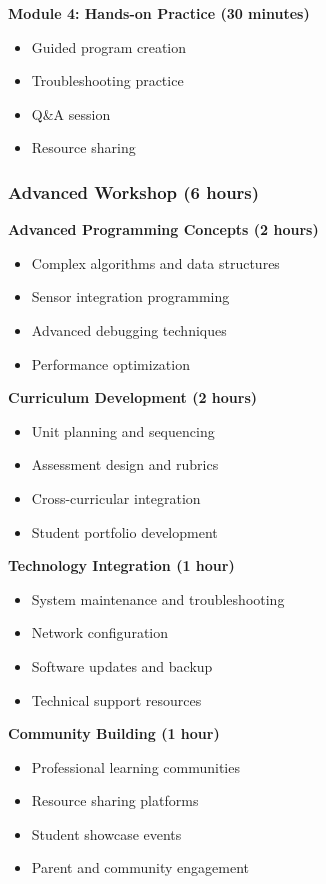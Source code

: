 \textbf{Module 4: Hands-on Practice (30 minutes)}
\begin{itemize}
    \item Guided program creation
    \item Troubleshooting practice
    \item Q&A session
    \item Resource sharing
\end{itemize}

\subsubsection{Advanced Workshop (6 hours)}

\textbf{Advanced Programming Concepts (2 hours)}
\begin{itemize}
    \item Complex algorithms and data structures
    \item Sensor integration programming
    \item Advanced debugging techniques
    \item Performance optimization
\end{itemize}

\textbf{Curriculum Development (2 hours)}
\begin{itemize}
    \item Unit planning and sequencing
    \item Assessment design and rubrics
    \item Cross-curricular integration
    \item Student portfolio development
\end{itemize}

\textbf{Technology Integration (1 hour)}
\begin{itemize}
    \item System maintenance and troubleshooting
    \item Network configuration
    \item Software updates and backup
    \item Technical support resources
\end{itemize}

\textbf{Community Building (1 hour)}
\begin{itemize}
    \item Professional learning communities
    \item Resource sharing platforms
    \item Student showcase events
    \item Parent and community engagement
\end{itemize}


